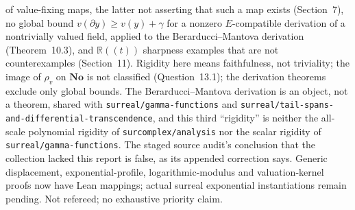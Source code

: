 \documentclass[11pt]{article}
\newcommand{\R}{\mathbb{R}}
\newcommand{\No}{\mathbf{No}}
\begin{document}
{of value-fixing maps, the latter not asserting that such a map exists
(Section~7), no global bound $v(\partial y)\ge v(y)+\gamma$ for a nonzero
$E$-compatible derivation of a nontrivially valued field, applied to the
Berarducci--Mantova derivation (Theorem~10.3), and $\R((t))$ sharpness
examples that are not counterexamples (Section~11).  Rigidity here means
faithfulness, not triviality; the image of $\rho_v$ on $\No$ is not
classified (Question~13.1); the derivation theorems exclude only global
bounds.  The Berarducci--Mantova derivation is an object, not a theorem,
shared with \nolinkurl{surreal/gamma-functions} and
\nolinkurl{surreal/tail-spans-and-differential-transcendence}, and this third
``rigidity'' is neither the all-scale polynomial rigidity of
\nolinkurl{surcomplex/analysis} nor the scalar rigidity of
\nolinkurl{surreal/gamma-functions}.  The staged source audit's conclusion
that the collection lacked this report is false, as its appended correction
says. Generic displacement, exponential-profile, logarithmic-modulus and
valuation-kernel proofs now have Lean mappings; actual surreal exponential
instantiations remain pending. Not refereed; no exhaustive priority claim.}
\end{document}

